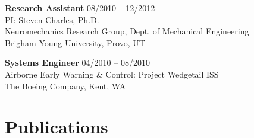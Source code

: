 \documentclass[letterpaper, 10pt]{article}
\begin{document}
\medskip

\textbf{Research Assistant} \hfill 08/2010 -- 12/2012
\\PI: Steven Charles, Ph.D.
\\Neuromechanics Research Group, Dept. of Mechanical Engineering
\\Brigham Young University, Provo, UT

\medskip

\textbf{Systems Engineer} \hfill 04/2010 -- 08/2010
\\Airborne Early Warning \& Control: Project Wedgetail ISS 
\\The Boeing Company, Kent, WA

\section{Publications}

\end{document}
